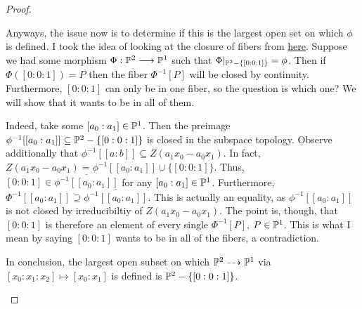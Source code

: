 \begin{proof}
\begin{enumerate}[label = (\alph*)]
        Anyways, the issue now is to determine if this is the largest open set on which $\phi$ is defined. I took the idea of looking at the closure of fibers from \href{https://math.stackexchange.com/questions/1932969/morphisms-from-mathbbp2-to-mathbbp1}{here}. Suppose we had some morphism $\Phi: \P^2 \longrightarrow \P^1$ such that $\Phi|_{\P^2 - \{[0:0:1]\}} = \phi$. Then if $\Phi([0:0:1]) = P$ then the fiber $\Phi^{-1}[P]$ will be closed by continuity. Furthermore, $[0:0:1]$ can only be in one fiber, so the question is which one? We will show that it wants to be in all of them.

        Indeed, take some $[a_0 : a_1] \in \P^1$. Then the preimage $\phi^{-1}[[a_0 : a_1]] \subseteq \P^2 - \{[0:0:1]\}$ is closed in the subspace topology. Observe additionally that $\phi^{-1}[[a:b]] \subseteq Z(a_1 x_0 - a_0 x_1)$. In fact, $Z(a_1 x_0 - a_0 x_1) = \phi^{-1}[[a_0 : a_1]] \cup \{[0:0:1]\}$. Thus, $[0:0:1] \in \overline{\phi^{-1}[[a_0 : a_1]]}$ for any $[a_0 : a_1] \in \P^1$. Furthermore, $\Phi^{-1}[[a_0 : a_1]] \supseteq \overline{\phi^{-1}[[a_0 : a_1]]}$. This is actually an equality, as $\phi^{-1}[[a_0:a_1]]$ is not closed by irreducibiltiy of $Z(a_1 x_0 - a_0 x_1)$. The point is, though, that $[0 : 0 : 1]$ is therefore an element of every single $\Phi^{-1}[P]$, $P \in \P^1$. This is what I mean by saying $[0:0:1]$ wants to be in all of the fibers, a contradiction.

        In conclusion, the largest open subset on which $\P^2 \dashrightarrow \P^1$ via $[x_0 : x_1 : x_2] \mapsto [x_0 : x_1]$ is defined is $\P^2 - \{[0:0:1]\}$.
    \end{enumerate}
\end{proof}

